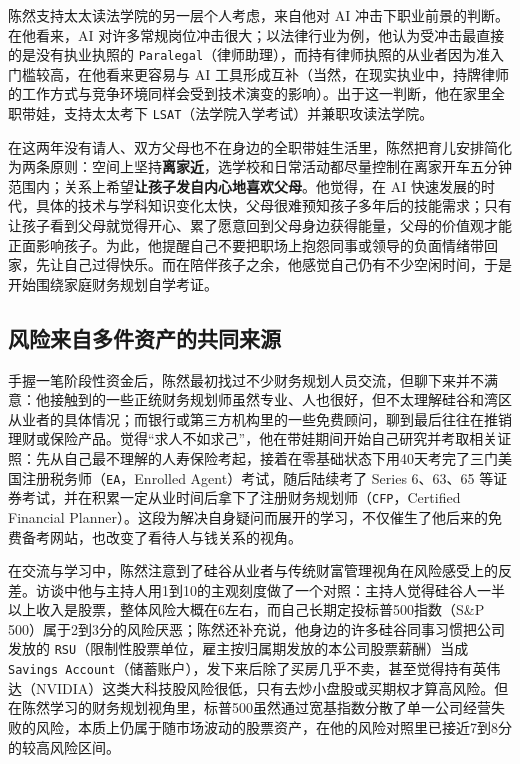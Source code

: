 \documentclass[UTF8,a4paper,11pt,fontset=fandol]{ctexart}
\begin{document}
陈然支持太太读法学院的另一层个人考虑，来自他对 AI 冲击下职业前景的判断。在他看来，AI 对许多常规岗位冲击很大；以法律行业为例，他认为受冲击最直接的是没有执业执照的 \texttt{Paralegal}（律师助理），而持有律师执照的从业者因为准入门槛较高，在他看来更容易与 AI 工具形成互补（当然，在现实执业中，持牌律师的工作方式与竞争环境同样会受到技术演变的影响）。出于这一判断，他在家里全职带娃，支持太太考下 \texttt{LSAT}（法学院入学考试）并兼职攻读法学院。

在这两年没有请人、双方父母也不在身边的全职带娃生活里，陈然把育儿安排简化为两条原则：空间上坚持\textbf{离家近}，选学校和日常活动都尽量控制在离家开车五分钟范围内；关系上希望\textbf{让孩子发自内心地喜欢父母}。他觉得，在 AI 快速发展的时代，具体的技术与学科知识变化太快，父母很难预知孩子多年后的技能需求；只有让孩子看到父母就觉得开心、累了愿意回到父母身边获得能量，父母的价值观才能正面影响孩子。为此，他提醒自己不要把职场上抱怨同事或领导的负面情绪带回家，先让自己过得快乐。而在陪伴孩子之余，他感觉自己仍有不少空闲时间，于是开始围绕家庭财务规划自学考证。

\subsection{风险来自多件资产的共同来源}
手握一笔阶段性资金后，陈然最初找过不少财务规划人员交流，但聊下来并不满意：他接触到的一些正统财务规划师虽然专业、人也很好，但不太理解硅谷和湾区从业者的具体情况；而银行或第三方机构里的一些免费顾问，聊到最后往往在推销理财或保险产品。觉得“求人不如求己”，他在带娃期间开始自己研究并考取相关证照：先从自己最不理解的人寿保险考起，接着在零基础状态下用40天考完了三门美国注册税务师（\texttt{EA}，Enrolled Agent）考试，随后陆续考了 Series 6、63、65 等证券考试，并在积累一定从业时间后拿下了注册财务规划师（\texttt{CFP}，Certified Financial Planner）。这段为解决自身疑问而展开的学习，不仅催生了他后来的免费备考网站，也改变了看待人与钱关系的视角。

在交流与学习中，陈然注意到了硅谷从业者与传统财富管理视角在风险感受上的反差。访谈中他与主持人用1到10的主观刻度做了一个对照：主持人觉得硅谷人一半以上收入是股票，整体风险大概在6左右，而自己长期定投标普500指数（S\&P 500）属于2到3分的风险厌恶；陈然还补充说，他身边的许多硅谷同事习惯把公司发放的 \texttt{RSU}（限制性股票单位，雇主按归属期发放的本公司股票薪酬）当成 \texttt{Savings Account}（储蓄账户），发下来后除了买房几乎不卖，甚至觉得持有英伟达（NVIDIA）这类大科技股风险很低，只有去炒小盘股或买期权才算高风险。但在陈然学习的财务规划视角里，标普500虽然通过宽基指数分散了单一公司经营失败的风险，本质上仍属于随市场波动的股票资产，在他的风险对照里已接近7到8分的较高风险区间。
\end{document}
